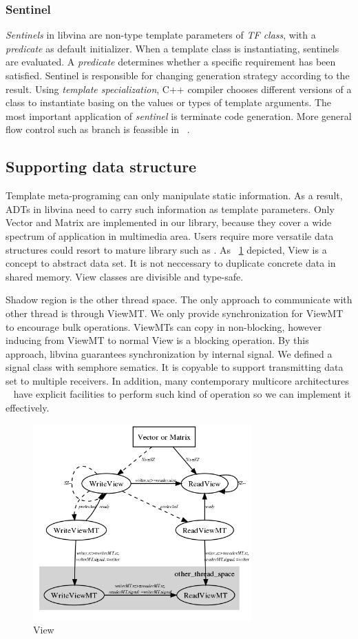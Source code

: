 \documentclass[10pt, conference, compsocconf]{IEEEtran}
\begin{document}

\subsubsection{Sentinel}
\emph{Sentinels} in libvina are non-type template parameters of \emph{TF class}, with a \emph{predicate} as default initializer. When a template class is instantiating, sentinels are evaluated.  A \emph{predicate} determines whether a specific requirement has been satisfied. Sentinel is responsible for changing generation strategy according to the result. Using \emph{template specialization}, C++ compiler chooses different versions of a class to instantiate basing on the values or types of template arguments. The most important application of \emph{sentinel} is terminate code generation. More general flow control such as branch is feassible in ~\cite{16}.

\subsection{Supporting data structure}
Template meta-programing can only manipulate static information. As a result, ADTs in libvina need to carry such information as template parameters. Only Vector and Matrix are implemented in our library, because they cover a wide spectrum of application in multimedia area. Users require more versatile data structures could resort to mature library such as \cite{b10}. As ~\ref{fig:view} depicted, View is a concept to abstract data set. It is not neccessary to duplicate concrete data in shared memory. View classes are divisible and type-safe.

Shadow region is the other thread space. The only approach to communicate with other thread is through ViewMT. We only provide synchronization for ViewMT to encourage bulk operations. ViewMTs can copy in non-blocking, however inducing from ViewMT to normal View is a blocking operation. By this approach, libvina guarantees synchronization by internal signal. We defined a signal class with semphore sematics. It is copyable to support transmitting data set to multiple receivers. In addition, many contemporary multicore architectures ~\cite{b20} have explicit facilities to perform such kind of operation so we can implement it effectively.

\begin{figure}
\includegraphics[width=3.3in]{view_concept}
\caption{View}
\label{fig:view}
\end{figure}
\end{document}
